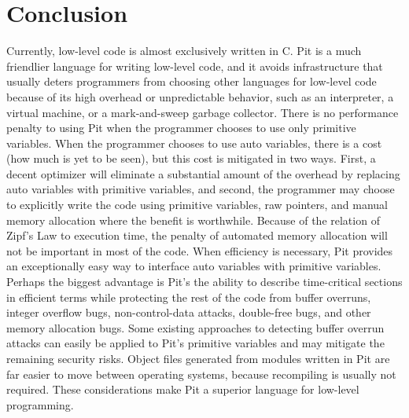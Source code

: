 \section{Conclusion}

Currently, low-level code is almost exclusively written in C.  Pit is a much friendlier language for writing low-level
code, and it avoids infrastructure that usually deters programmers from choosing other languages for low-level code
because of its high overhead or unpredictable behavior, such as an interpreter, a virtual machine, or a mark-and-sweep
garbage collector.  There is no performance penalty to using Pit when the programmer chooses to use only primitive
variables.  When the programmer chooses to use auto variables, there is a cost (how much is yet to be seen), but this
cost is mitigated in two ways.  First, a decent optimizer will eliminate a substantial amount of the overhead by
replacing auto variables with primitive variables, and second, the programmer may choose to explicitly write the code
using primitive variables, raw pointers, and manual memory allocation where the benefit is worthwhile.  Because of the
relation of Zipf's Law to execution time, the penalty of automated memory allocation will not be important in most of
the code.  When efficiency is necessary, Pit provides an exceptionally easy way to interface auto variables with
primitive variables.  Perhaps the biggest advantage is Pit's the ability to describe time-critical sections in
efficient terms while protecting the rest of the code from buffer overruns, integer overflow bugs, non-control-data
attacks, double-free bugs, and other memory allocation bugs.  Some existing approaches to detecting buffer overrun
attacks can easily be applied to Pit's primitive variables and may mitigate the remaining security risks.  Object files
generated from modules written in Pit are far easier to move between operating systems, because recompiling is usually
not required.  These considerations make Pit a superior language for low-level programming.
